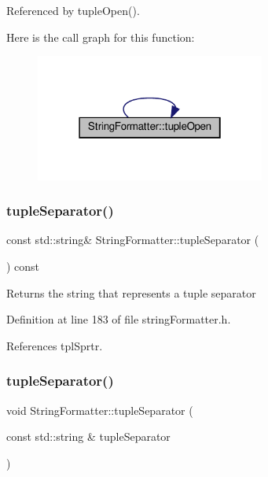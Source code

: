 Referenced by tuple\+Open().

Here is the call graph for this function\+:
\nopagebreak
\begin{figure}[H]
\begin{center}
\leavevmode
\includegraphics[width=214pt]{classStringFormatter_a00feccf99bdd348dd6ffc2af29cb9ec7_cgraph}
\end{center}
\end{figure}
\mbox{\label{classStringFormatter_afee51fc4fa3fc6fed6afa13fd1aab2de}} 
\subsubsection{\texorpdfstring{tuple\+Separator()}{tupleSeparator()}\hspace{0.1cm}{\footnotesize\ttfamily [1/2]}}
{\footnotesize\ttfamily const std\+::string\& String\+Formatter\+::tuple\+Separator (\begin{DoxyParamCaption}{ }\end{DoxyParamCaption}) const\hspace{0.3cm}{\ttfamily [inline]}}

\begin{DoxyReturn}{Returns}
the string that represents a tuple separator 
\end{DoxyReturn}


Definition at line 183 of file string\+Formatter.\+h.



References tpl\+Sprtr.

\mbox{\label{classStringFormatter_a5346783f609217a80f49d542e2b4468c}} 
\subsubsection{\texorpdfstring{tuple\+Separator()}{tupleSeparator()}\hspace{0.1cm}{\footnotesize\ttfamily [2/2]}}
{\footnotesize\ttfamily void String\+Formatter\+::tuple\+Separator (\begin{DoxyParamCaption}\item[{const std\+::string \&}]{tuple\+Separator }\end{DoxyParamCaption})\hspace{0.3cm}{\ttfamily [inline]}}

